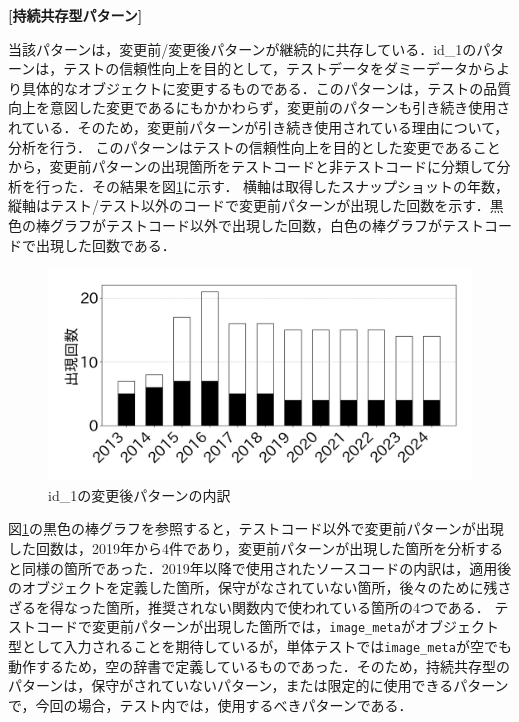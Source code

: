 \documentclass[submit,techrep,noauthor]{ipsj}
\begin{document}
\noindent\textbf{[持続共存型パターン]} 

当該パターンは，変更前/変更後パターンが継続的に共存している．id\_1のパターンは，テストの信頼性向上を目的として，テストデータをダミーデータからより具体的なオブジェクトに変更するものである．このパターンは，テストの品質向上を意図した変更であるにもかかわらず，変更前のパターンも引き続き使用されている．そのため，変更前パターンが引き続き使用されている理由について，分析を行う．
このパターンはテストの信頼性向上を目的とした変更であることから，変更前パターンの出現箇所をテストコードと非テストコードに分類して分析を行った．その結果を図\ref{figure:test_or_not}に示す．
横軸は取得したスナップショットの年数，縦軸はテスト/テスト以外のコードで変更前パターンが出現した回数を示す．黒色の棒グラフがテストコード以外で出現した回数，白色の棒グラフがテストコードで出現した回数である．
\begin{figure}[h]
    \includegraphics[width=0.9\linewidth]{@BSthesis2024_Noguchi/Noguchi_fig/test_or_not_test.png}
    \vspace{-4mm}
    \caption{id\_1の変更後パターンの内訳}
    \label{figure:test_or_not}
\end{figure}

図\ref{figure:test_or_not}の黒色の棒グラフを参照すると，テストコード以外で変更前パターンが出現した回数は，2019年から4件であり，変更前パターンが出現した箇所を分析すると同様の箇所であった．2019年以降で使用されたソースコードの内訳は，適用後のオブジェクトを定義した箇所，保守がなされていない箇所，後々のために残さざるを得なった箇所，推奨されない関数内で使われている箇所の4つである．
テストコードで変更前パターンが出現した箇所では，\texttt{image\_meta}がオブジェクト型として入力されることを期待しているが，単体テストでは\texttt{image\_meta}が空でも動作するため，空の辞書で定義しているものであった．そのため，持続共存型のパターンは，保守がされていないパターン，または限定的に使用できるパターンで，今回の場合，テスト内では，使用するべきパターンである．
\end{document}
